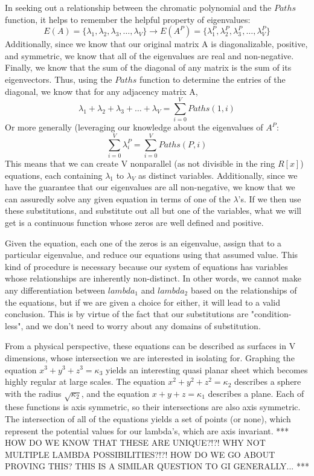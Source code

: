 \documentclass[a4paper,12pt]{article}
\begin{document}
In seeking out a relationship between the chromatic polynomial and the \(Paths\) function, it helps to remember the helpful property of  eigenvalues:
\[E(A) = \{\lambda_1,\lambda_2,\lambda_3, \dots, \lambda_V\} \rightarrow E(A^P) = \{\lambda_1^P,\lambda_2^P,\lambda_3^P, \dots, \lambda_V^P\} \]
Additionally, since we know that our original matrix A is diagonalizable, positive, and symmetric, we know that all of the eigenvalues are real and non-negative. Finally, we know that the sum of the diagonal of any matrix is the sum of its eigenvectors. Thus, using the \(Paths\) function to determine the entries of the diagonal, we know that for any adjacency matrix A,
\[\lambda_1 + \lambda_2 + \lambda_3 + \dots + \lambda_V = \sum_{i = 0}^{V}{Paths(1, i)}\]
Or more generally (leveraging our knowledge about the eigenvalues of \(A^P\):
\[ \sum_{i = 0}^V{\lambda_i^P} =  \sum_{i = 0}^{V}{Paths(P, i)}\]
This means that we can create V nonparallel (as not divisible in the ring \(R[x]\)) equations, each containing \(\lambda_1\) to \(\lambda_V\) as distinct variables.  Additionally, since we have the guarantee that our eigenvalues are all non-negative, we know that we can assuredly solve any given equation in terms of one of the \(\lambda\)'s.  If we then use these substitutions, and substitute out all but one of the variables, what we will get is a continuous function whose zeros are well defined and positive. 

Given the equation, each one of the zeros is an eigenvalue, assign that to a particular eigenvalue, and reduce our equations using that assumed value.  This kind of procedure is necessary because our system of equations has variables whose relationships are inherently non-distinct.  In other words, we cannot make any differentiation between \(lambda_1\) and \(lambda_2\) based on the relationships of the equations, but if we are given a choice for either, it will lead to a valid conclusion.  This is by virtue of the fact that our substitutions are "condition-less", and we don't need to worry about any domains of substitution.

From a physical perspective, these equations can be described as surfaces in V dimensions, whose intersection we are interested in isolating for. Graphing the equation \(x^3 + y^3 + z^3 = \kappa_3\) yields an interesting quasi planar sheet which becomes highly regular at large scales.  The equation \(x^2 + y^2 + z^2 = \kappa_2\) describes a sphere with the radius \(\sqrt{\kappa_2}\), and the equation \(x + y + z = \kappa_1\) describes a plane. Each of these functions is axis symmetric, so their intersections are also axis symmetric.  The intersection of all of the equations yields a set of points (or none), which represent the potential values for our lambda's, which are axis invariant. *** HOW DO WE KNOW THAT THESE ARE UNIQUE?!?! WHY NOT MULTIPLE LAMBDA POSSIBILITIES?!?! HOW DO WE GO ABOUT PROVING THIS? THIS IS A SIMILAR QUESTION TO GI GENERALLY... ***
\end{document}
